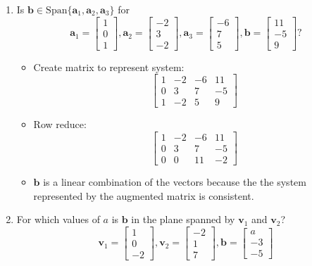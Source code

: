 \documentclass[12pt,a4paper]{exam}
\newcommand{\bb}{\mathbf{b}}
\newcommand{\bv}{\mathbf{v}}
\begin{document}
\begin{enumerate}
\item
 Is $\mathbf{b}\in \mathrm{Span}\{\mathbf{a}_1,\mathbf{a}_2,\mathbf{a}_3\}$ for
 \[ \mathbf{a}_1 = \left[ \begin{array}{c} 1 \\ 0 \\ 1 
\end{array} \right],
\mathbf{a}_2 = \left[ \begin{array}{c} -2 \\ 3 \\ -2 
\end{array} \right],
\mathbf{a}_3 = \left[ \begin{array}{c} -6 \\ 7 \\ 5 
\end{array} \right],
\mathbf{b} = \left[ \begin{array}{c} 11 \\ -5 \\ 9 
\end{array} \right]? \]

\begin{solution}
  \begin{itemize}
    \item Create matrix to represent system:\\
      \[
      \left[ \begin{array}{cccc}
          1 & -2 & -6 & 11 \\ 0 & 3 & 7 & -5 \\ 1 & -2 & 5 & 9
      \end{array} \right]
      \]
    \item Row reduce:\\
      \[
      \left[ \begin{array}{cccc}
          1 & -2 & -6 & 11 \\ 0 & 3 & 7 & -5 \\ 0 & 0 & 11 & -2
      \end{array} \right]
      \]
    \item $\bb$ is a linear combination of the vectors because the the system represented by the augmented matrix is consistent.
  \end{itemize}
\end{solution}



\item
 For which values of $a$ is $\bb$ in the plane spanned by $\bv_1$ and $\bv_2$?
 \[ \bv_1 = \left[ \begin{array}{c} 1 \\ 0 \\ -2 
\end{array} \right],
\bv_2 = \left[ \begin{array}{c} -2 \\ 1 \\ 7 
\end{array} \right],
\bb = \left[ \begin{array}{c} a \\ -3 \\ -5 
\end{array} \right] \]



\end{enumerate}
\end{document}
